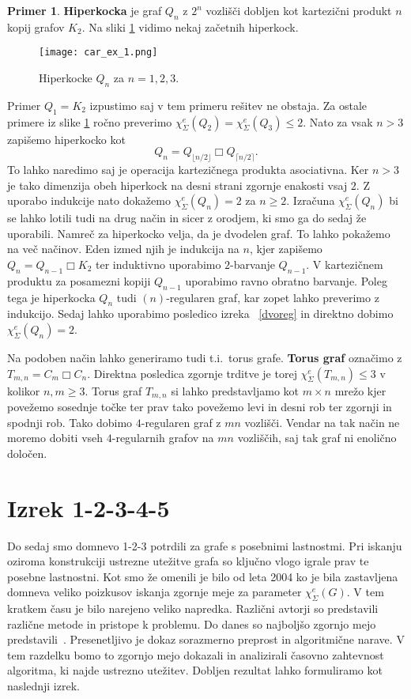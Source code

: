 \documentclass[12pt,a4paper,twoside]{article}
\theoremstyle{definition} %
\newtheorem{primer}[definicija]{Primer}
\theoremstyle{plain} %
\newcommand{\ec}{\chi_{\Sigma}^e}
\numberwithin{equation}{section}  %
\DeclareMathOperator{\cart}{\Box}
\begin{document}
\begin{primer}
\textbf{Hiperkocka} je graf $Q_n$ z $2^n$ vozlišči dobljen kot kartezični produkt $n$ kopij grafov $K_2$. Na sliki \ref{hip} vidimo nekaj začetnih hiperkock.
 \begin{figure}[h!]
\caption{Hiperkocke $Q_n$ za $n=1,2,3$.}
\label{hip}
\centering
    \texttt{[image: car\_ex\_1.png]}
    \end{figure}
Primer $Q_1 = K_2$ izpustimo saj v tem primeru rešitev ne obstaja. Za ostale primere iz slike \ref{hip}  ročno preverimo $\ec(Q_2) = \ec(Q_3) \le 2.$ Nato za vsak $n > 3$ zapišemo hiperkocko kot
 $$Q_n = Q_{\lfloor n/2 \rfloor}  \cart Q_{\lceil n/2 \rceil}.$$
 To lahko naredimo saj je operacija kartezičnega produkta asociativna. Ker $n > 3$ je tako dimenzija obeh hiperkock na desni strani zgornje enakosti vsaj $2$. Z uporabo indukcije nato dokažemo $\ec(Q_n) = 2$ za $ n \ge 2$. Izračuna $\ec(Q_n)$ bi se lahko lotili tudi na drug način in sicer z orodjem, ki smo ga do sedaj že uporabili. Namreč za hiperkocko velja, da je dvodelen graf. To lahko pokažemo na več načinov.  Eden izmed njih je indukcija na $n$, kjer zapišemo $Q_n = Q_{n-1}  \cart K_2$ ter induktivno uporabimo $2$-barvanje $Q_{n-1}$. V kartezičnem produktu za posamezni kopiji $Q_{n-1}$ uporabimo ravno obratno barvanje. Poleg tega je hiperkocka $Q_n$ tudi $(n)$-regularen graf, kar zopet lahko preverimo z indukcijo. Sedaj lahko uporabimo posledico izreka ~\ref{dvoreg} in direktno dobimo $\ec(Q_n) = 2$.

Na podoben način lahko generiramo tudi t.i.\ torus grafe. \textbf{Torus graf} označimo z $T_{m,n} = C_m  \cart C_n$. Direktna posledica zgornje trditve je torej $\ec(T_{m,n}) \le 3$ v kolikor $n,m \ge 3$. Torus graf $T_{m,n}$ si lahko predstavljamo kot $m \times n$ mrežo kjer povežemo sosednje točke ter prav tako povežemo levi in desni rob ter zgornji in spodnji rob. Tako dobimo $4$-regularen graf z $mn$ vozlišči. Vendar na tak način ne moremo dobiti vseh $4$-regularnih grafov na $mn$ vozliščih, saj tak graf ni enolično določen.
\end{primer}




 
 \section{Izrek 1-2-3-4-5}
Do sedaj smo domnevo 1-2-3 potrdili za grafe s posebnimi lastnostmi. Pri iskanju oziroma konstrukciji ustrezne utežitve grafa so ključno vlogo igrale prav te posebne lastnostni.  Kot smo že omenili je bilo od leta 2004 ko je bila zastavljena domneva veliko poizkusov iskanja zgornje meje za parameter $\ec(G)$. V tem kratkem času je bilo narejeno veliko napredka. Različni avtorji so predstavili različne metode in pristope k problemu. Do danes so najboljšo zgornjo mejo predstavili~\citet{proof12345}. Presenetljivo je dokaz sorazmerno preprost in algoritmične narave. V tem razdelku bomo to zgornjo mejo dokazali in analizirali časovno zahtevnost algoritma, ki najde ustrezno utežitev. Dobljen rezultat lahko formuliramo kot naslednji izrek.
\end{document}
